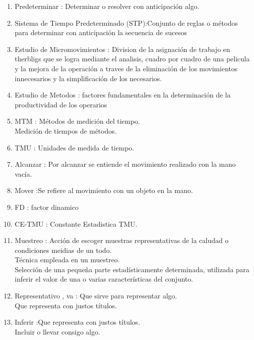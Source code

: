 \begin{enumerate}
    \item Predeterminar : Determinar o resolver con anticipación algo.
    
    \item Sistema de Tiempo Predeterminado (STP):Conjunto de reglas o métodos para determinar con anticipación la secuencia de sucesos
    
    \item Estudio de Micromovimientos : Division de la asignación de trabajo en therbligs que se logra mediante el analisis, cuadro por cuadro de una pelicula y la mejora de la operación a traves de la eliminación de los movimientos innecesarios y la simplificación de los necesarios.
    
    \item Estudio de Metodos : factores fundamentales en la determinación de la productividad de los operarios
    
    \item MTM : Métodos de medición del tiempo.
    \\Medición de tiempos de métodos.
    
    \item TMU : Unidades de medida de tiempo.
    
    \item Alcanzar : Por alcanzar se entiende el movimiento realizado con la mano vacía.
    
    \item Mover :Se refiere al movimiento con un objeto en la mano.
    
    \item FD : factor dinamico
    
    \item CE-TMU : Constante Estadistica TMU. 
    
    \item Muestreo : Acción de escoger muestras representativas de la caludad o condiciones meidias de un todo.
        \\Técnica empleada en un muestreo.
        \\ Selección de una pequeña parte estadísticamente determinada, utilizada para inferir el valor de una o varias características del conjunto.
        
    \item Representativo , va : Que sirve para representar algo.
    \\Que representa con justos títulos.
    
    \item Inferir :Que representa con justos títulos.
    \\Incluir o llevar consigo algo.
    

\end{enumerate}
